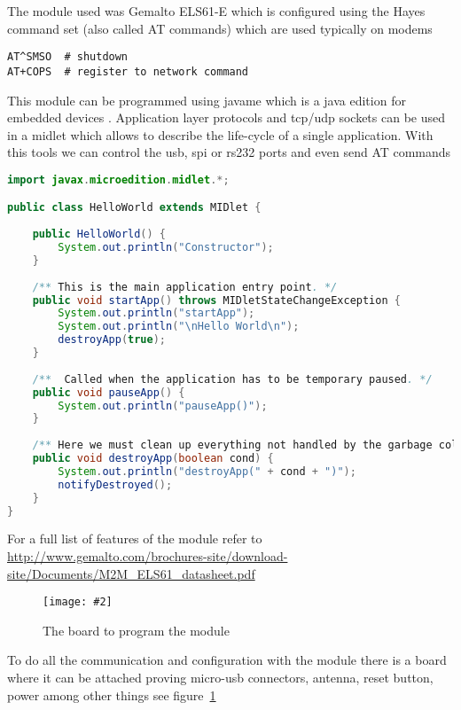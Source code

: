 \documentclass[hidelinks,11pt,a4paper,oneside,article]{memoir}
\numberwithin{equation}{chapter}
\newcommand{\putimage}[3][10] %
{
\begin{figure}[h]
	\centering
	\captionsetup{justification=centering}
	\texttt{[image: \#2]}
	\caption{#3}
	\label{fig:#2}
\end{figure}
}
\begin{document}
The module used was Gemalto ELS61-E which is configured using the Hayes command set (also called AT commands) which are used typically on modems %

\begin{lstlisting}[style=styleprogramming,caption={AT commands},label=at_commands]
AT^SMSO  # shutdown
AT+COPS  # register to network command
\end{lstlisting}\vspace{-17pt}


This module can be programmed using \gls{javame} which is a \gls{java} edition for embedded devices \cite{javame}. Application layer protocols and \gls{tcp}/\gls{udp} sockets can be used in a \gls{midlet} which allows to describe the life-cycle of a single application. With this tools we can control the \gls{usb}, \gls{spi} or \gls{rs232} ports and even send AT commands


\begin{lstlisting}[language=Java,style=styleprogramming,caption={MIDlet application life-cycle example},label=midlet-example]
import javax.microedition.midlet.*;

public class HelloWorld extends MIDlet {
	
	public HelloWorld() {
		System.out.println("Constructor");
	}
	
	/** This is the main application entry point. */
	public void startApp() throws MIDletStateChangeException {
		System.out.println("startApp");
		System.out.println("\nHello World\n");
		destroyApp(true);
	}
	
	/**  Called when the application has to be temporary paused. */
	public void pauseApp() {
		System.out.println("pauseApp()");
	}
	
	/** Here we must clean up everything not handled by the garbage collector. */
	public void destroyApp(boolean cond) {
		System.out.println("destroyApp(" + cond + ")");
		notifyDestroyed();
	}
}

\end{lstlisting}\vspace{-17pt}


For a full list of features of the module refer to \url{http://www.gemalto.com/brochures-site/download-site/Documents/M2M_ELS61_datasheet.pdf}


	\putimage{lte_board}{The board to program the module}
To do all the communication and configuration with the module there is a board where it can be attached proving micro-usb connectors, antenna, reset button, power among other things see figure~\ref{fig:lte_board}
\end{document}
